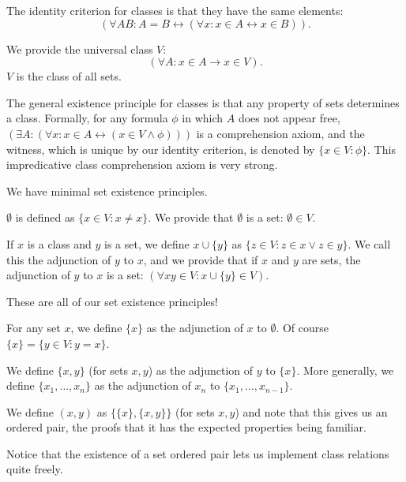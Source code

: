 \documentclass{slides}
\begin{document}
\begin{slide}

The identity criterion for classes is that they have the same elements:  $$(\forall AB: A = B \leftrightarrow (\forall x:x \in A \leftrightarrow x \in B)).$$

We provide the universal class $V$:  $$(\forall A:x \in A \rightarrow x \in V).$$  $V$ is the class of all sets.

The general existence principle for classes is that any property of sets determines a class.  Formally, for any formula $\phi$ in which $A$ does not appear free, $(\exists A:(\forall x:x \in A \leftrightarrow (x \in V \wedge \phi)))$ is a comprehension axiom,
and the witness, which is unique by our identity criterion, is denoted by $\{x \in V:\phi\}$.  This impredicative class comprehension axiom is very strong.


\end{slide}

\begin{slide}

We have minimal set existence principles.

$\emptyset$ is defined as $\{x \in V:x \neq x\}$.  We provide that $\emptyset$ is a set: $\emptyset \in V$.

If $x$ is a class and $y$ is a set, we define $x \cup \{y\}$ as $\{z \in V:z \in x \vee z \in y\}$.  We call this the adjunction of $y$ to $x$, and we provide that if $x$ and $y$ are sets, the adjunction of $y$ to $x$ is a set: $(\forall xy \in V:x \cup \{y\} \in V)$.

These are all of our set existence principles!


\end{slide}

\begin{slide}

For any set $x$, we define $\{x\}$ as the adjunction of $x$ to $\emptyset$.  Of course $\{x\} = \{y \in V:y=x\}$.

We define $\{x,y\}$ (for sets $x,y$) as the adjunction of $y$ to $\{x\}$.  More generally, we define $\{x_1,\ldots,x_n\}$
as the adjunction of $x_n$ to $\{x_1,\ldots,x_{n-1}\}$.

We define $(x,y)$ as $\{\{x\},\{x,y\}\}$ (for sets $x,y$) and note that this gives us an ordered pair, the proofs that it has the expected properties being familiar.

Notice that the existence of a set ordered pair lets us implement class relations quite freely.

\end{slide}
\end{document}
